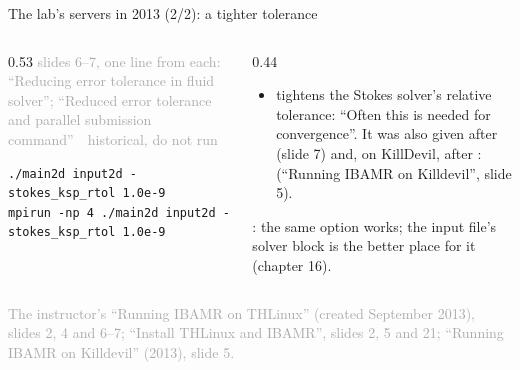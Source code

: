 \documentclass[aspectratio=169,11pt]{beamer}
\newcommand{\sourcecredit}[1]{\vfill\begin{flushright}\tiny\textcolor{DarkGray}{#1}\end{flushright}}
\newcommand{\hist}[1]{{\tiny\sffamily\textcolor{DarkGray}{#1\ \textbullet\ historical, do not run}}\par\nointerlineskip\vspace{0.3mm}}
\begin{document}
\begin{frame}[fragile]{The lab's servers in 2013 (2/2): a tighter tolerance}
\label{fr:screen2013b}
\begin{columns}[T,onlytextwidth]
\begin{column}{0.53\textwidth}
\hist{slides 6--7, one line from each: ``Reducing error tolerance in fluid solver''; ``Reduced error tolerance and parallel submission command''}
\begin{lstlisting}[style=hist]
./main2d input2d -stokes_ksp_rtol 1.0e-9
mpirun -np 4 ./main2d input2d -stokes_ksp_rtol 1.0e-9
\end{lstlisting}
\end{column}
\begin{column}{0.44\textwidth}
\footnotesize
\begin{itemize}\setlength{\itemsep}{2pt}
  \item {} tightens the Stokes solver's relative tolerance: ``Often this is needed for convergence''. It was also given after  (slide 7) and, on KillDevil, after :  (``Running IBAMR on Killdevil'', slide 5).
\end{itemize}
\vspace{1mm}
: the same option works; the input file's solver block is the better place for it (chapter 16).
\end{column}
\end{columns}
\sourcecredit{The instructor's ``Running IBAMR on THLinux'' (created September 2013), slides 2, 4 and 6--7; ``Install THLinux and IBAMR'', slides 2, 5 and 21; ``Running IBAMR on Killdevil'' (2013), slide 5.}
\end{frame}
\end{document}
